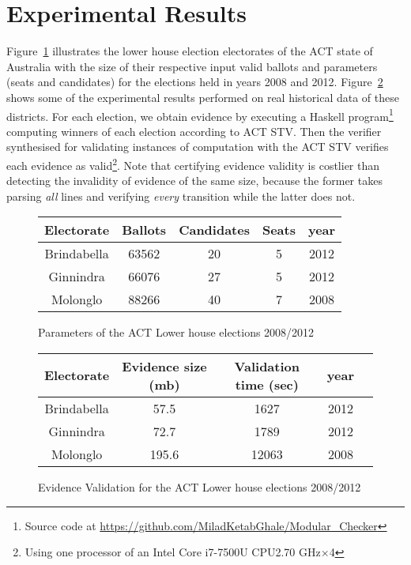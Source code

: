 \documentclass[10pt,conference]{IEEEtran}
\begin{document}
\section{Experimental Results}

Figure~\ref{ParamACT} illustrates the lower house election electorates of the ACT state of Australia with the size of their respective input valid ballots and parameters (seats and candidates) for the elections held in years 2008 and 2012. Figure~\ref{EvACT} shows some of the experimental results performed on real historical data of these districts. For each election, we obtain evidence  by executing a Haskell program\footnote{Source code at \url{https://github.com/MiladKetabGhale/Modular_Checker}} computing winners of each election  according to ACT STV. Then the verifier synthesised for validating instances of computation with the ACT STV verifies each evidence as valid\footnote{Using one processor of an Intel Core i7-7500U CPU\@ 2.70 GHz$\times$4}. Note that certifying evidence  validity is costlier than detecting the invalidity of evidence of the same size, because the former takes parsing  \emph{all} lines and verifying \emph{every} transition  while the latter does not. 
\begin{figure}[t]
\centering
\begin{small}
\begin{tabular}{|c | c | c | c | c|}
\hline
Electorate&Ballots&Candidates&Seats&year\\
\hline
Brindabella&63562&20&5&2012\\
\hline
Ginnindra&66076&27&5&2012\\
\hline
Molonglo&88266&40&7&2008\\
\hline
\end{tabular}
\end{small} 
\caption{Parameters of the ACT Lower house elections 2008/2012} 
\label{ParamACT}
\end{figure}
\begin{figure}[h]
\centering
\begin{small}
\begin{tabular}{|c | c | c | c | c|}
\hline
Electorate&Evidence size (mb)&Validation time (sec)&year\\
\hline
Brindabella&57.5&1627&2012\\
\hline
Ginnindra&72.7&1789&2012\\
\hline
Molonglo&195.6&12063&2008\\
\hline
\end{tabular}
\end{small} 
\caption{Evidence Validation for the ACT Lower house elections 2008/2012}
\label{EvACT} 
\end{figure}
\end{document}
